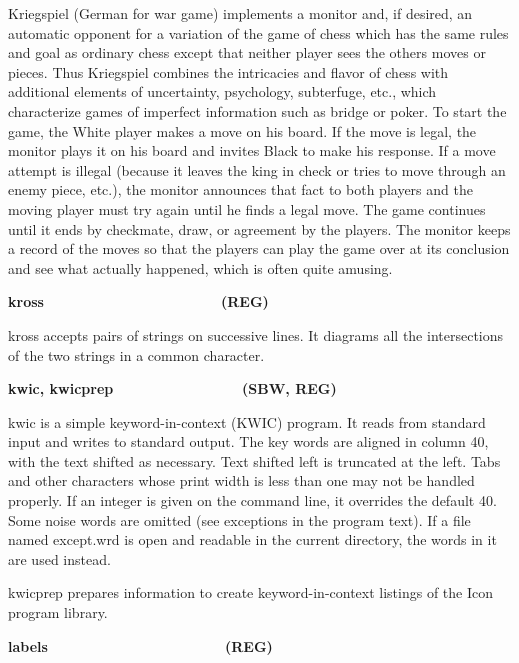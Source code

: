 Kriegspiel (German for {\textquotedbl}war game{\textquotedbl})
implements a monitor and, if desired, an automatic opponent for a
variation of the game of chess which has the same rules and goal as
ordinary chess except that neither player sees the
other{\textquotesingle}s moves or pieces. Thus Kriegspiel combines the
intricacies and flavor of chess with additional elements of
uncertainty, psychology, subterfuge, etc., which characterize games of
imperfect information such as bridge or poker. To start the game, the
{\textquotedbl}White{\textquotedbl} player makes a move on his board.
If the move is legal, the monitor plays it on his board and invites
{\textquotedbl}Black{\textquotedbl} to make his response. If a move
attempt is illegal (because it leaves the king in check or tries to
move through an enemy piece, etc.), the monitor announces that fact to
both players and the moving player must try again until he finds a
legal move. The game continues until it ends by checkmate, draw, or
agreement by the players. The monitor keeps a record of the moves so
that the players can play the game over at its conclusion and see what
actually happened, which is often quite amusing.

{\sffamily\bfseries
kross\ \ \ \ \ \ \ \ \ \ \ \ \ \ \ \ \ \ \ \ \ \ (REG)}

\textsf{kross} accepts pairs of strings on successive lines. It diagrams
all the intersections of the two strings in a common character. 

{\sffamily\bfseries
kwic, kwicprep\ \ \ \ \ \ \ \ \ \ \ \ \ \ \ \ (SBW, REG)}

\textsf{kwic} is a simple keyword-in-context (KWIC) program.
It reads from standard input and writes to standard output. The
{\textquotedbl}key{\textquotedbl} words are aligned in column 40, with
the text shifted as necessary. Text shifted left is truncated at the
left. Tabs and other characters whose {\textquotedbl}print
width{\textquotedbl} is less than one may not be handled properly. If
an integer is given on the command line, it overrides the default 40.
Some noise words are omitted (see
{\textquotedbl}exceptions{\textquotedbl} in the program text). If a
file named \textsf{except.wrd} is open and readable in the current
directory, the words in it are used instead. 

\textsf{kwicprep} prepares information to create keyword-in-context
listings of the Icon program library. 

{\sffamily\bfseries
labels\ \ \ \ \ \ \ \ \ \ \ \ \ \ \ \ \ \ \ \ \ \ (REG)}

